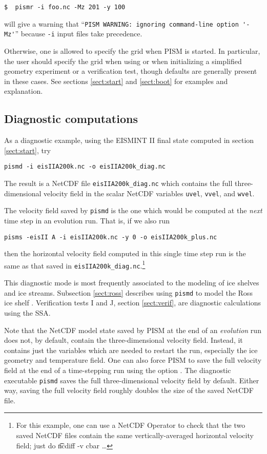 \verb|$  pismr -i foo.nc -Mz 201 -y 100|

\noindent will give a warning that ``\verb|PISM WARNING: ignoring command-line option '-Mz'|'' because \verb|-i| input files take precedence.

Otherwise, one is allowed to specify the grid when PISM is started.  In particular, the user should specify the grid when using  or when initializing a simplified geometry experiment or a verification test, though defaults are generally present in these cases.  See sections \ref{sect:start} and \ref{sect:boot} for examples and explanation.


\subsection{Diagnostic computations}  As a diagnostic example, using the EISMINT II final state computed in section \ref{sect:start}, try

\verb|pismd -i eisIIA200k.nc -o eisIIA200k_diag.nc|

\noindent The result is a NetCDF file \verb|eisIIA200k_diag.nc| which contains the full three-dimensional velocity field in the scalar NetCDF variables \verb|uvel|, \verb|vvel|, and \verb|wvel|.

The velocity field saved by \verb|pismd| is the one which would be computed at the \emph{next} time step in an evolution run.  That is, if we also run

\verb|pisms -eisII A -i eisIIA200k.nc -y 0 -o eisIIA200k_plus.nc|

\noindent then the horizontal velocity field computed in this single time step run is the same as that saved in \verb|eisIIA200k_diag.nc|.\footnote{For this example, one can use a NetCDF Operator to check that the two saved NetCDF files contain the same vertically-averaged horizontal velocity field; just do \t{ncdiff -v cbar} \dots}

This diagnostic mode is most frequently associated to the modeling of ice shelves and ice streams.  Subsection \ref{sect:ross} describes using \verb|pismd| to model the Ross ice shelf \cite{MacAyealetal}.  Verification tests I and J, section \ref{sect:verif}, are diagnostic calculations using the SSA.

Note that the NetCDF model state saved by PISM at the end of an \emph{evolution} run does not, by default, contain the three-dimensional velocity field.  Instead, it contains just the variables which are needed to restart the run, especially the ice geometry and temperature field.  One can also force PISM to save the full velocity field at the end of a time-stepping run using the option .  The diagnostic executable \verb|pismd| saves the full three-dimensional velocity field by default.  Either way, saving the full velocity field roughly doubles the size of the saved NetCDF file.



